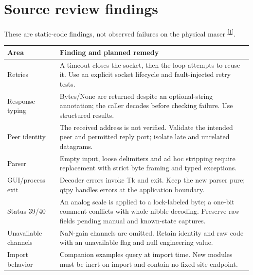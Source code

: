 \documentclass[11pt,a4paper]{article}
\newcommand{\codecite}{\textsuperscript{\href{https://raw.githubusercontent.com/Braveheart53/GBO_Maser_Control/main/T4_Maser_Comms.py}{[1]}}}
\begin{document}
\section{Source review findings}
These are static-code findings, not observed failures on the physical maser
\codecite.
\begin{longtable}{@{}p{.24\linewidth}p{.70\linewidth}@{}}
\toprule
Area & Finding and planned remedy\\
\midrule
Retries & A timeout closes the socket, then the loop attempts to reuse it.
Use an explicit socket lifecycle and fault-injected retry tests.\\
Response typing & Bytes/None are returned despite an optional-string annotation;
the caller decodes before checking failure. Use structured results.\\
Peer identity & The received address is not verified. Validate the intended
peer and permitted reply port; isolate late and unrelated datagrams.\\
Parser & Empty input, loose delimiters and ad hoc stripping require replacement
with strict byte framing and typed exceptions.\\
GUI/process exit & Decoder errors invoke Tk and exit. Keep the new parser pure;
qtpy handles errors at the application boundary.\\
Status 39/40 & An analog scale is applied to a lock-labeled byte; a one-bit
comment conflicts with whole-nibble decoding. Preserve raw fields pending
manual and known-state captures.\\
Unavailable channels & NaN-gain channels are omitted. Retain identity and raw
code with an unavailable flag and null engineering value.\\
Import behavior & Companion examples query at import time. New modules must
be inert on import and contain no fixed site endpoint.\\
\bottomrule
\end{longtable}
\clearpage
\end{document}

